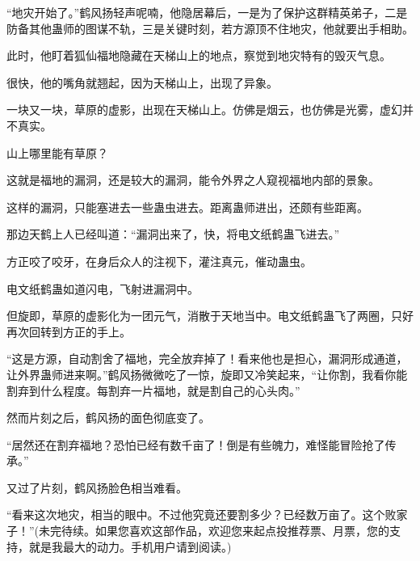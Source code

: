 \begin{this_body}
“地灾开始了。”鹤风扬轻声呢喃，他隐居幕后，一是为了保护这群精英弟子，二是防备其他蛊师的图谋不轨，三是关键时刻，若方源顶不住地灾，他就要出手相助。

此时，他盯着狐仙福地隐藏在天梯山上的地点，察觉到地灾特有的毁灭气息。

很快，他的嘴角就翘起，因为天梯山上，出现了异象。

一块又一块，草原的虚影，出现在天梯山上。仿佛是烟云，也仿佛是光雾，虚幻并不真实。

山上哪里能有草原？

这就是福地的漏洞，还是较大的漏洞，能令外界之人窥视福地内部的景象。

这样的漏洞，只能塞进去一些蛊虫进去。距离蛊师进出，还颇有些距离。

那边天鹤上人已经叫道：“漏洞出来了，快，将电文纸鹤蛊飞进去。”

方正咬了咬牙，在身后众人的注视下，灌注真元，催动蛊虫。

电文纸鹤蛊如道闪电，飞射进漏洞中。

但旋即，草原的虚影化为一团元气，消散于天地当中。电文纸鹤蛊飞了两圈，只好再次回转到方正的手上。

“这是方源，自动割舍了福地，完全放弃掉了！看来他也是担心，漏洞形成通道，让外界蛊师进来啊。”鹤风扬微微吃了一惊，旋即又冷笑起来，“让你割，我看你能割弃到什么程度。每割弃一片福地，就是割自己的心头肉。”

然而片刻之后，鹤风扬的面色彻底变了。

“居然还在割弃福地？恐怕已经有数千亩了！倒是有些魄力，难怪能冒险抢了传承。”

又过了片刻，鹤风扬脸色相当难看。

“看来这次地灾，相当的眼中。不过他究竟还要割多少？已经数万亩了。这个败家子！”(未完待续。如果您喜欢这部作品，欢迎您来起点投推荐票、月票，您的支持，就是我最大的动力。手机用户请到阅读。)

\end{this_body}

